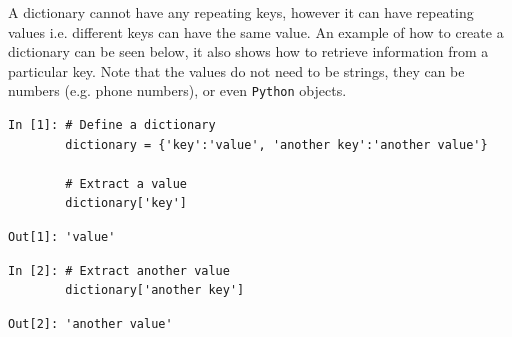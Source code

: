 \noindent A dictionary cannot have any repeating keys, however it can have repeating values i.e. different keys can have the same value. An example of how to create a dictionary can be seen below, it also shows how to retrieve information from a particular key. Note that the values do not need to be strings, they can be numbers (e.g. phone numbers), or even \texttt{Python} objects.  
\begin{lstlisting}[style=PY]
In [1]: # Define a dictionary
        dictionary = {'key':'value', 'another key':'another value'}
        
        # Extract a value
        dictionary['key']
\end{lstlisting}
\begin{lstlisting}[style=PY_out]
Out[1]: 'value'
\end{lstlisting}
\begin{lstlisting}[style=PY]
In [2]: # Extract another value
        dictionary['another key']
\end{lstlisting}
\begin{lstlisting}[style=PY_out]
Out[2]: 'another value'
\end{lstlisting}

\newpage

